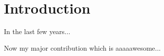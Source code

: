 

\chapter{Introduction}	\label{ch::introduction}
	
In the last few years...

Now my major contribution which is aaaaawesome...


\par 


